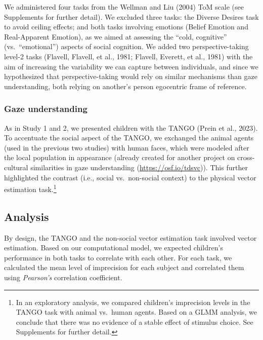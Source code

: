 \documentclass[
  man,mask,floatsintext]{apa7}
\begin{document}
We administered four tasks from the Wellman and Liu (2004) ToM scale (see Supplements for further detail). We excluded three tasks: the Diverse Desires task to avoid ceiling effects; and both tasks involving emotions (Belief Emotion and Real-Apparent Emotion), as we aimed at assessing the ``cold, cognitive'' (vs.~``emotional'') aspects of social cognition. We added two perspective-taking level-2 tasks (Flavell, Flavell, et al., 1981; Flavell, Everett, et al., 1981) with the aim of increasing the variability we can capture between individuals, and since we hypothesized that perspective-taking would rely on similar mechanisms than gaze understanding, both relying on another's person egocentric frame of reference.

\hypertarget{gaze-understanding}{%
\subsubsection{Gaze understanding}\label{gaze-understanding}}

As in Study 1 and 2, we presented children with the TANGO (Prein et al., 2023). To accentuate the social aspect of the TANGO, we exchanged the animal agents (used in the previous two studies) with human faces, which were modeled after the local population in appearance (already created for another project on cross-cultural similarities in gaze understanding (\url{https://osf.io/tdsvc})). This further highlighted the contrast (i.e., social vs.~non-social context) to the physical vector estimation task.\footnote{In an exploratory analysis, we compared children's imprecision levels in the TANGO task with animal vs.~human agents. Based on a GLMM analysis, we conclude that there was no evidence of a stable effect of stimulus choice. See Supplements for further detail.}

\hypertarget{analysis-2}{%
\subsection{Analysis}\label{analysis-2}}

By design, the TANGO and the non-social vector estimation task involved vector estimation. Based on our computational model, we expected children's performance in both tasks to correlate with each other. For each task, we calculated the mean level of imprecision for each subject and correlated them using \emph{Pearson's} correlation coefficient.
\end{document}
